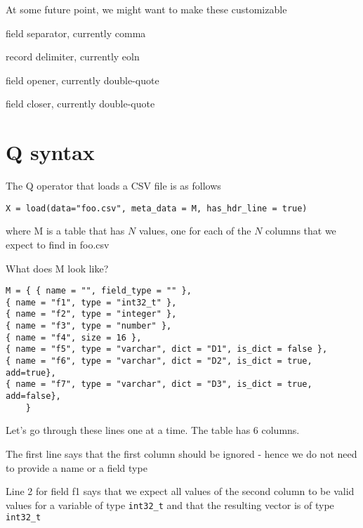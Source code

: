 \documentclass[letterpaper]{article}
\begin{document}
\ee
At some future point, we might want to make these customizable
\be
\item field separator, currently comma
\item record delimiter, currently eoln
\item field opener, currently double-quote
\item field closer, currently double-quote
  \ee

\section{Q syntax}
The Q operator that loads a CSV file is as follows
\begin{verbatim}
X = load(data="foo.csv", meta_data = M, has_hdr_line = true)
\end{verbatim}

where M is a table that has \(N\) values, one for each of the \(N\) columns
that we expect to find in foo.csv

What does M look like?
\begin{verbatim}
M = { { name = "", field_type = "" },
{ name = "f1", type = "int32_t" },
{ name = "f2", type = "integer" },
{ name = "f3", type = "number" },
{ name = "f4", size = 16 },
{ name = "f5", type = "varchar", dict = "D1", is_dict = false }, 
{ name = "f6", type = "varchar", dict = "D2", is_dict = true, add=true},
{ name = "f7", type = "varchar", dict = "D3", is_dict = true, add=false},
    }
\end{verbatim}

Let's go through these lines one at a time. The table has 6 columns.

\be
\item 
The first line says that the first column should be ignored - hence we
do not need to provide a name or a field type
\item 
Line 2 for field f1 says that we expect all values of the second column to
be valid values for a variable of type \verb+int32_t+ and that the
resulting vector is of type \verb+int32_t+
\end{document}
